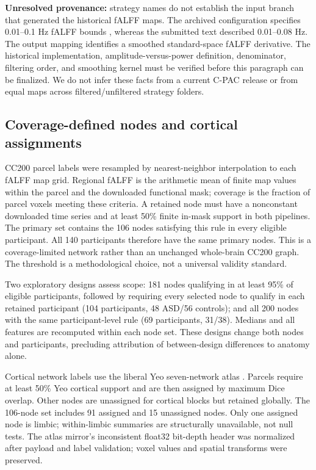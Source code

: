 \documentclass[10pt,letterpaper]{article}
\begin{document}
\textbf{Unresolved provenance:} strategy names do not establish the input branch
that generated the historical fALFF maps. The archived configuration specifies
0.01--0.1 Hz fALFF bounds \cite{PCPconfigRevision}, whereas the submitted text described 0.01--0.08 Hz.
The output mapping identifies a smoothed standard-space fALFF derivative.
The historical implementation, amplitude-versus-power definition, denominator,
filtering order, and smoothing kernel must be verified before this paragraph can be finalized.
We do not infer these facts from a current C-PAC release or from equal maps
across filtered/unfiltered strategy folders.

\subsection*{Coverage-defined nodes and cortical assignments}
CC200 parcel labels were resampled by nearest-neighbor interpolation to each
fALFF map grid. Regional fALFF is the arithmetic mean of finite map values within
the parcel and the downloaded functional mask; coverage is the fraction of parcel
voxels meeting these criteria. A retained node must have a nonconstant downloaded
time series and at least 50\% finite in-mask support in both pipelines.
The primary set contains the 106 nodes satisfying this rule in every eligible
participant. All 140 participants therefore have the same primary nodes.
This is a coverage-limited network rather than an unchanged whole-brain CC200 graph.
The threshold is a methodological choice, not a universal validity standard.

Two exploratory designs assess scope: 181 nodes qualifying in at least 95\% of
eligible participants, followed by requiring every selected node to qualify in
each retained participant (104 participants, 48 ASD/56 controls); and all 200 nodes
with the same participant-level rule (69 participants, 31/38). Medians and all
features are recomputed within each node set. These designs change both nodes and
participants, precluding attribution of between-design differences to anatomy alone.

Cortical network labels use the liberal Yeo seven-network atlas \cite{Yeo2011}.
Parcels require at least 50\% Yeo cortical support and are then assigned by maximum
Dice overlap. Other nodes are unassigned for cortical blocks but retained globally.
The 106-node set includes 91 assigned and 15 unassigned nodes. Only one assigned
node is limbic; within-limbic summaries are structurally unavailable, not null tests.
The atlas mirror's inconsistent float32 bit-depth header was normalized after
payload and label validation; voxel values and spatial transforms were preserved.
\end{document}
